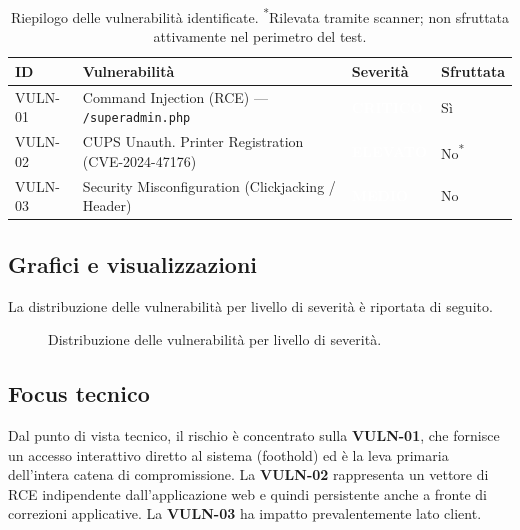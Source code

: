 \documentclass[11pt]{article}
\newcommand{\sev}[2]{%
  \setlength{\fboxsep}{3pt}%
  \colorbox{#1}{\textcolor{white}{\small\textbf{#2}}}%
}
\newcommand{\sevCRIT}{\sev{sevCritico}{CRITICO}}
\newcommand{\sevHIGH}{\sev{sevElevato}{ELEVATO}}
\newcommand{\sevMED}{\sev{sevMedio}{MEDIO}}
\begin{document}
\begin{table}[H]
\centering
\renewcommand{\arraystretch}{1.4}
\begin{tabular}{>{\centering\arraybackslash}p{1.6cm} p{6.5cm} >{\centering\arraybackslash}p{2.6cm} >{\centering\arraybackslash}p{2.2cm}}
\toprule
\textbf{ID} & \textbf{Vulnerabilità} & \textbf{Severità} & \textbf{Sfruttata} \\
\midrule
VULN-01 & Command Injection (RCE) — \texttt{/superadmin.php} & \sevCRIT & Sì \\
VULN-02 & CUPS Unauth. Printer Registration (CVE-2024-47176) & \sevHIGH & No\textsuperscript{*} \\
VULN-03 & Security Misconfiguration (Clickjacking / Header) & \sevMED & No \\
\bottomrule
\end{tabular}
\caption{Riepilogo delle vulnerabilità identificate. \textsuperscript{*}Rilevata tramite scanner; non sfruttata attivamente nel perimetro del test.}
\end{table}

\subsection{Grafici e visualizzazioni}
La distribuzione delle vulnerabilità per livello di severità è riportata di seguito.

\begin{figure}[H]
\centering
{}
\caption{Distribuzione delle vulnerabilità per livello di severità.}
\end{figure}

\subsection{Focus tecnico}
Dal punto di vista tecnico, il rischio è concentrato sulla \textbf{VULN-01}, che fornisce un accesso interattivo diretto al sistema (foothold) ed è la leva primaria dell'intera catena di compromissione. La \textbf{VULN-02} rappresenta un vettore di RCE indipendente dall'applicazione web e quindi persistente anche a fronte di correzioni applicative. La \textbf{VULN-03} ha impatto prevalentemente lato client.
\end{document}
